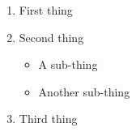 \documentclass[a4paper,12pt]{article}
\begin{document}
\begin{enumerate}
  \item First thing

  \item Second thing
    \begin{itemize}
      \item A sub-thing

      \item Another sub-thing
    \end{itemize}

  \item Third thing
\end{enumerate}
\end{document}
